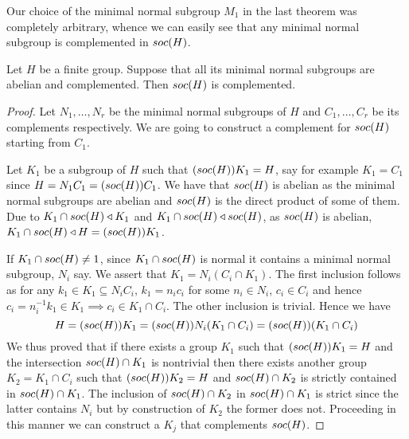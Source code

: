 Our choice of the minimal normal subgroup $M_1$ in the last theorem was completely arbitrary, whence we can easily see that any minimal normal subgroup is complemented in $soc {(H)}$.

 \begin{theorem}
    \label{th:SocC}
    Let $H$ be a finite group. Suppose that all its minimal normal subgroups are abelian and complemented. Then $soc {(H)}$ is complemented.
\end{theorem}

\begin{proof}
Let $N_1,\ldots ,N_r$ be the minimal normal subgroups of $H$ and $C_1,\ldots ,C_r$ be its complements respectively. We are going to construct a complement for $soc {(H)}$ starting from $C_1$.

Let $K_1$ be a subgroup of $H$ such that $(soc {(H)})K_1 = H$, say for example $K_1 = C_1$ since $H = N_1C_1 = (soc {(H)})C_1$.
We have that $soc {(H)}$ is abelian as the minimal normal subgroups are abelian and $soc {(H)}$ is the direct product of some of them.
Due to $K_1 \cap soc {(H)} \triangleleft K_1$ and $K_1 \cap soc {(H)} \triangleleft soc {(H)}$, as $soc {(H)}$ is abelian, $K_1 \cap soc {(H)} \triangleleft H = (soc {(H)}) K_1$.

If $K_1 \cap soc {(H)} \ne 1$, since $K_1 \cap soc {(H)}$ is normal it contains a minimal normal subgroup, $N_i$ say.
We assert that $K_1 = N_i(C_i \cap K_1)$. The first inclusion follows as for any $k_1 \in K_1 \subseteq N_iC_i$, $k_1 = n_ic_i$ for some $n_i \in N_i$, $c_i \in C_i$ and hence $c_i = n_i^{-1}k_1 \in K_1 \implies c_i \in K_1 \cap C_i$. The other inclusion is trivial. Hence we have
$$
H = (soc {(H)}) K_1 = (soc {(H)}) N_i(K_1 \cap C_i) = (soc {(H)}) (K_1 \cap C_i)
$$
We thus proved that if there exists a group $K_1$ such that $(soc {(H)}) K_1 = H$ and the intersection $soc {(H)} \cap K_1$ is nontrivial then there exists another group $K_2 = K_1 \cap C_i$ such that $(soc {(H)}) K_2 = H$ and $soc {(H)} \cap K_2$ is strictly contained in $soc {(H)} \cap K_1$. The inclusion of $soc {(H)} \cap K_2$ in $soc {(H)} \cap K_1$ is strict since the latter contains $N_i$ but by construction of $K_2$ the former does not. Proceeding in this manner we can construct a $K_j$ that complements $soc {(H)}$.

\end{proof}